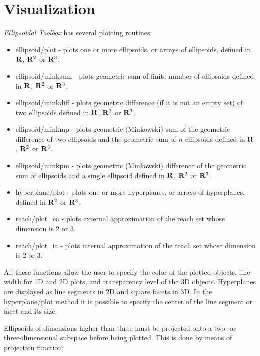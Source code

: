 \documentclass[letterpaper,10pt,english]{sphinxmanual}
\begin{document}
\section{Visualization}
\label{main_source:visualization}
\emph{Ellipsoidal Toolbox} has several plotting routines:
\begin{itemize}
\item {} 
ellipsoid/plot - plots one or more ellipsoids, or arrays of
ellipsoids, defined in ${\bf R}$, ${\bf R}^2$ or
${\bf R}^3$.

\item {} 
ellipsoid/minksum - plots geometric sum of finite number of
ellipsoids defined in ${\bf R}$, ${\bf R}^2$ or
${\bf R}^3$.

\item {} 
ellipsoid/minkdiff - plots geometric difference (if it is not an
empty set) of two ellipsoids defined in ${\bf R}$,
${\bf R}^2$ or ${\bf R}^3$.

\item {} 
ellipsoid/minkmp - plots geometric (Minkowski) sum of the geometric
difference of two ellipsoids and the geometric sum of $n$
ellipsoids defined in ${\bf R}$, ${\bf R}^2$ or
${\bf R}^3$.

\item {} 
ellipsoid/minkpm - plots geometric (Minkowski) difference of the
geometric sum of ellipsoids and a single ellipsoid defined in
${\bf R}$, ${\bf R}^2$ or ${\bf R}^3$.

\item {} 
hyperplane/plot - plots one or more hyperplanes, or arrays of
hyperplanes, defined in ${\bf R}^2$ or ${\bf R}^3$.

\item {} 
reach/plot\_ea - plots external approximation of the reach set whose
dimension is $2$ or $3$.

\item {} 
reach/plot\_ia - plots internal approximation of the reach set whose
dimension is $2$ or $3$.

\end{itemize}

All these functions allow the user to specify the color of the plotted
objects, line width for 1D and 2D plots, and transparency level of the
3D objects. Hyperplanes are displayed as line segments in 2D and square
facets in 3D. In the hyperplane/plot method it is possible to specify
the center of the line segment or facet and its size.

Ellipsoids of dimensions higher than three must be projected onto a two-
or three-dimensional subspace before being plotted. This is done by
means of projection function:
\end{document}
